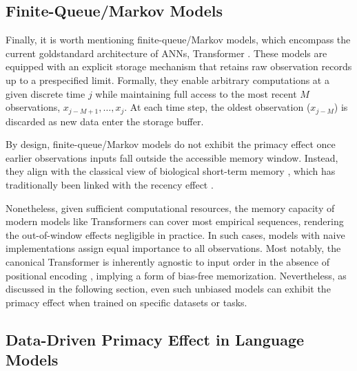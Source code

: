 \documentclass[10pt,letterpaper]{article}
\begin{document}
\subsection{Finite-Queue/Markov Models}

Finally, it is worth mentioning finite-queue/Markov models, which encompass the current goldstandard architecture of ANNs, Transformer \citep{Vaswani+17_AttentionIsAllYouNeed}.
These models are equipped with an explicit storage mechanism that retains raw observation records up to a prespecified limit.
Formally, they enable arbitrary computations at a given discrete time $j$ while maintaining full access to the most recent $M$ observations, $x_{j-M+1}, \dots, x_{j}$.
At each time step, the oldest observation ($x_{j-M}$) is discarded as new data enter the storage buffer.

By design, finite-queue/Markov models do not exhibit the primacy effect once earlier observations inputs fall outside the accessible memory window.
Instead, they align with the classical view of biological short-term memory \cite{Miller56}, which has traditionally been linked with the recency effect \citep{WaughNorman65,GlanzerCunitz66,AtkinsonShiffrin68}.

Nonetheless, given sufficient computational resources, the memory capacity of modern models like Transformers can cover most empirical sequences, rendering the out-of-window effects negligible in practice.
In such cases, models with naive implementations assign equal importance to all observations.
Most notably, the canonical Transformer is inherently agnostic to input order in the absence of positional encoding \citep{Vaswani+17_AttentionIsAllYouNeed}, implying a form of bias-free memorization.
Nevertheless, as discussed in the following section, even such unbiased models can exhibit the primacy effect when trained on specific datasets or tasks.

\subsection{Data-Driven Primacy Effect in Language Models}
\end{document}
